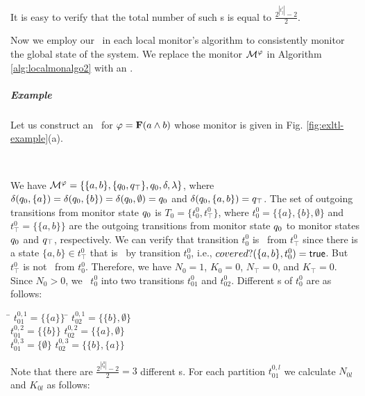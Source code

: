 It is easy to verify that the total number of such \partitionn s is equal to $\frac{2^{|t_j^i|}-2}{2}$. 

Now we employ our \Exltl~in each local monitor's algorithm to consistently monitor the global state of the system. We replace the \LTLtri monitor $\mathcal{M}^\varphi$ in Algorithm \ref{alg:localmonalgo2} with an \Exltl. \\

%


\subparagraph{Example} Let us construct an \Exltl~for $\varphi = \mathbf{F} (a \wedge 
b)$ whose \LTLtri monitor is given in Fig. \ref{fig:exltl-example}(a).


  

\ \   \ \


We have $\mathcal{M}^\varphi = \{ \{a, b\}, \{q_0, q_\top\}, 
q_0, \delta, \lambda   \}$, where $\delta(q_0, \{a\}) = 
\delta(q_0, \{b\}) = \delta(q_0, \emptyset) = q_0$ and 
$\delta(q_0, \{a, b\}) = q_\top$. The set of outgoing 
transitions from monitor state $q_0$ is $T_0 = \{t_0^0, t_\top^0\}$, 
where  $t_0^0 = \{\{a\}, \{b\}, \emptyset\}$ and $t_\top^0 = \{\{a,b\}\}$ are 
the outgoing transitions from monitor state $q_0$ to monitor states 
$q_0$ and $q_\top$, respectively. We can verify that transition 
$t_0^0$ is \indist~from $t_\top^0$ since there is a state $\{a, b\} \in 
t_\top^0$ that is \covered~by transition $t_0^0$, i.e., $covered? (\{a, b\}, t_0^0) 
= \mathsf{true}$. But $t_\top^0$ is not \indist~from $t_0^0$. Therefore, we have $N_0 = 
1$, $K_0 = 0$, $N_\top = 0$, and $K_\top = 0$. Since $N_0 > 0$, we \splt~$t_0^0$ 
into two transitions $t_{01}^0$ and $t_{02}^0$. Different \partitionn s of 
$t_0^0$ are as follows: 

\begin{tabbing}
\hspace{2cm}\= $t_{01}^{0,1} = \{\{a\}\}$ \hspace{1cm} \= $t_{02}^{0,1} = 
\{\{b\}, \emptyset\}$ \\
\> $t_{01}^{0,2} = \{\{b\}\}$ \> $t_{02}^{0,2} = \{\{a\}, \emptyset\}$ \\
\> $t_{01}^{0,3} = \{\emptyset\}$ \> $t_{02}^{0,3} = \{\{b\}, \{a\}\}$ 
\end{tabbing}

Note that there are $\frac{2^{|t_0^0|}-2}{2} = 3$ different \partitionn s. For 
each partition $t_{01}^{0,l}$ we calculate $N_{0l}$ and $K_{0l}$ as follows:


